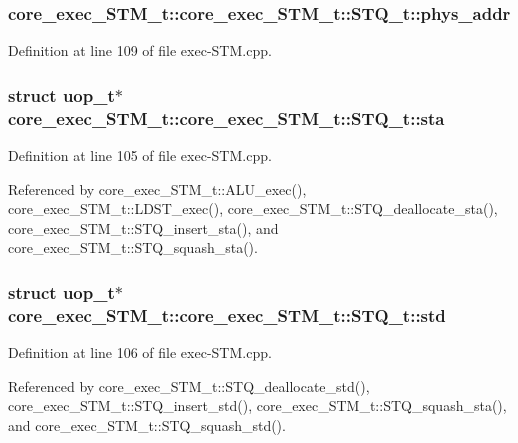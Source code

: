\subsubsection[{phys\_\-addr}]{ core\_\-exec\_\-STM\_\-t::core\_\-exec\_\-STM\_\-t::STQ\_\-t::phys\_\-addr}\label{structcore__exec__STM__t_1_1STQ__t_e6a3f1693daaf4ab2346d7acb88cd8ee}




Definition at line 109 of file exec-STM.cpp.
\subsubsection[{sta}]{\setlength{\rightskip}{0pt plus 5cm}struct {\bf uop\_\-t}$\ast$ core\_\-exec\_\-STM\_\-t::core\_\-exec\_\-STM\_\-t::STQ\_\-t::sta\hspace{0.3cm}{\tt  [read]}}\label{structcore__exec__STM__t_1_1STQ__t_639f22dde1faf69fa2a5020e03b792c1}




Definition at line 105 of file exec-STM.cpp.

Referenced by core\_\-exec\_\-STM\_\-t::ALU\_\-exec(), core\_\-exec\_\-STM\_\-t::LDST\_\-exec(), core\_\-exec\_\-STM\_\-t::STQ\_\-deallocate\_\-sta(), core\_\-exec\_\-STM\_\-t::STQ\_\-insert\_\-sta(), and core\_\-exec\_\-STM\_\-t::STQ\_\-squash\_\-sta().
\subsubsection[{std}]{\setlength{\rightskip}{0pt plus 5cm}struct {\bf uop\_\-t}$\ast$ core\_\-exec\_\-STM\_\-t::core\_\-exec\_\-STM\_\-t::STQ\_\-t::std\hspace{0.3cm}{\tt  [read]}}\label{structcore__exec__STM__t_1_1STQ__t_13ec230e190d35cdf9fadd4adb23a527}




Definition at line 106 of file exec-STM.cpp.

Referenced by core\_\-exec\_\-STM\_\-t::STQ\_\-deallocate\_\-std(), core\_\-exec\_\-STM\_\-t::STQ\_\-insert\_\-std(), core\_\-exec\_\-STM\_\-t::STQ\_\-squash\_\-sta(), and core\_\-exec\_\-STM\_\-t::STQ\_\-squash\_\-std().
